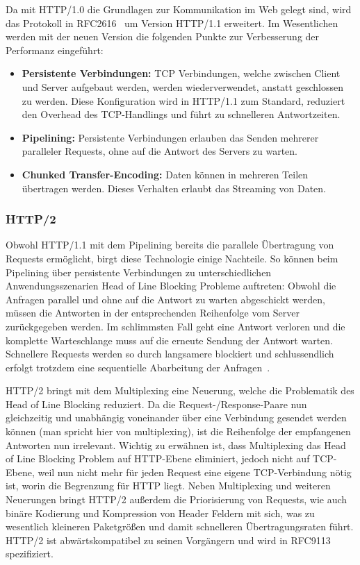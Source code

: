 Da mit HTTP/1.0 die Grundlagen zur Kommunikation im Web gelegt sind, wird das Protokoll in RFC2616~\cite{rfc2616} um Version HTTP/1.1 erweitert.
Im Wesentlichen werden mit der neuen Version die folgenden Punkte zur Verbesserung der Performanz eingeführt:

\begin{itemize}
    \item \textbf{Persistente Verbindungen:} TCP Verbindungen, welche zwischen Client und Server aufgebaut werden, werden wiederverwendet, anstatt geschlossen zu werden.
    Diese Konfiguration wird in HTTP/1.1 zum Standard, reduziert den Overhead des TCP-Handlings und führt zu schnelleren Antwortzeiten.
    \item \textbf{Pipelining:} Persistente Verbindungen erlauben das Senden mehrerer paralleler Requests, ohne auf die Antwort des Servers zu warten.
    \item \textbf{Chunked Transfer-Encoding:} Daten können in mehreren Teilen übertragen werden.
    Dieses Verhalten erlaubt das Streaming von Daten.
\end{itemize}

\subsubsection{HTTP/2}

Obwohl HTTP/1.1 mit dem Pipelining bereits die parallele Übertragung von Requests ermöglicht, birgt diese Technologie einige Nachteile.
So können beim Pipelining über persistente Verbindungen zu unterschiedlichen Anwendungsszenarien Head of Line Blocking Probleme auftreten:
Obwohl die Anfragen parallel und ohne auf die Antwort zu warten abgeschickt werden, müssen die Antworten in der entsprechenden Reihenfolge vom Server zurückgegeben werden.
Im schlimmsten Fall geht eine Antwort verloren und die komplette Warteschlange muss auf die erneute Sendung der Antwort warten.
Schnellere Requests werden so durch langsamere blockiert und schlussendlich erfolgt trotzdem eine sequentielle Abarbeitung der Anfragen~\cite{7179400}.

HTTP/2 bringt mit dem Multiplexing eine Neuerung, welche die Problematik des Head of Line Blocking reduziert.
Da die Request-/Response-Paare nun gleichzeitig und unabhängig voneinander über eine Verbindung gesendet werden können (man spricht hier von multiplexing), ist die Reihenfolge der empfangenen Antworten nun irrelevant.
Wichtig zu erwähnen ist, dass Multiplexing das Head of Line Blocking Problem auf HTTP-Ebene eliminiert, jedoch nicht auf TCP-Ebene, weil nun nicht mehr für jeden Request eine eigene TCP-Verbindung nötig ist, worin die Begrenzung für HTTP liegt.
Neben Multiplexing und weiteren Neuerungen bringt HTTP/2 außerdem die Priorisierung von Requests, wie auch binäre Kodierung und Kompression von Header Feldern mit sich, was zu wesentlich kleineren Paketgrößen und damit schnelleren Übertragungsraten führt.
HTTP/2 ist abwärtskompatibel zu seinen Vorgängern und wird in RFC9113~\cite{rfc9113} spezifiziert.

